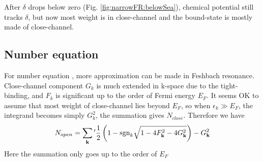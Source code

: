 After $\delta$ drops below zero (Fig. \ref{fig:narrowFR:belowSea}), chemical potential still tracks $\delta$, but now most weight is in close-channel and the bound-state is mostly made of close-channel.  

\subsection{Number equation}
For number equation , more approximation can be made in Feshbach resonance.  Close-channel component $G_{k}$ is much extended in k-space due to the tight-binding, and $F_{k}$ is significant up to the order of Fermi energy $E_{F}$.  It seems OK to assume that most weight of close-channel lies beyond $E_{F}$, so when $\epsilon_{k}\gg{E_{F}}$, the integrand becomes simply $G_{k}^{2}$, the summation gives $N_{close}$.  Therefore we have 
\begin{equation}\label{eq:20100909:number}
N_{open}=\sum_{\mathbf{k}}{}'\frac{1}{2} \left(1-\text{sgn}_{k}\sqrt{1-4 F_{\mathbf{k}}^2-4 G_{\mathbf{k}}^2}\right)-G_{\mathbf{k}}^{2}
\end{equation} 
Here the summation only goes up to the order of $E_{F}$